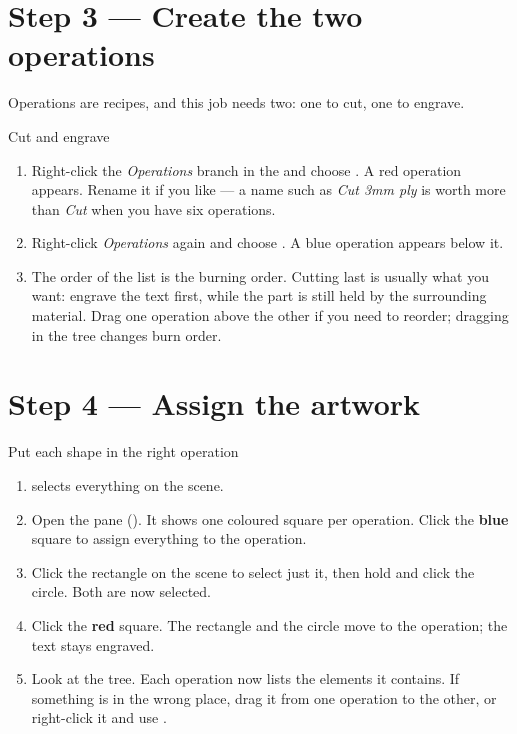 \section{Step 3 --- Create the two operations}

Operations are recipes, and this job needs two: one to cut, one to engrave.

\begin{walkthrough}{Cut and engrave}
\begin{enumerate}[label=\arabic*.,leftmargin=1.4em]
  \item Right-click the \emph{Operations} branch in the  and choose
        . A red operation appears. Rename it if
        you like --- a name such as \emph{Cut 3mm ply} is worth more than
        \emph{Cut} when you have six operations.
  \item Right-click \emph{Operations} again and choose . A blue operation appears below it.
  \item The order of the list is the burning order. Cutting last is usually what
        you want: engrave the text first, while the part is still held by the
        surrounding material. Drag one operation above the other if you need to
        reorder; dragging in the tree changes burn order.
\end{enumerate}
\end{walkthrough}

\section{Step 4 --- Assign the artwork}

\begin{walkthrough}{Put each shape in the right operation}
\begin{enumerate}[label=\arabic*.,leftmargin=1.4em]
  \item {} selects everything on the scene.
  \item Open the  pane (). It shows
        one coloured square per operation. Click the \textbf{blue} square to
        assign everything to the  operation.
  \item Click the rectangle on the scene to select just it, then hold 
        and click the circle. Both are now selected.
  \item Click the \textbf{red} square. The rectangle and the circle move to the
         operation; the text stays engraved.
  \item Look at the tree. Each operation now lists the elements it contains. If
        something is in the wrong place, drag it from one operation to the other,
        or right-click it and use .
\end{enumerate}
\end{walkthrough}


